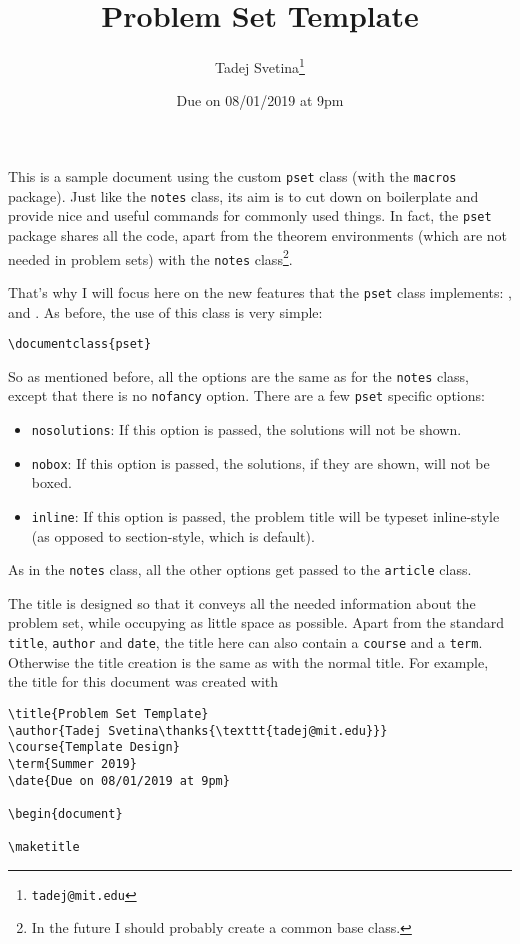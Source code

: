 \documentclass[letterpaper,11pt]{pset}
\title{Problem Set Template}
\author{Tadej Svetina\thanks{\texttt{tadej@mit.edu}}}
\date{Due on 08/01/2019 at 9pm}
\theoremstyle{remark}
\begin{document}
\maketitle

This is a sample document using the custom \texttt{pset} class (with the \texttt{macros} package). Just like the \texttt{notes} class, its aim is to cut down on boilerplate and provide nice and useful commands for commonly used things. In fact, the \texttt{pset} package shares all the code, apart from the theorem environments (which are not needed in problem sets) with the \texttt{notes} class\footnote{In the future I should probably create a common base class.}. 

That's why I will focus here on the new features that the \texttt{pset} class implements: ,  and . As before, the use of this class is very simple:
\begin{verbatim}
\documentclass{pset}
\end{verbatim}

So as mentioned before, all the options are the same as for the \texttt{notes} class, except that there is no \texttt{nofancy} option. There are a few \texttt{pset} specific options:
\begin{itemize}
    \item \texttt{nosolutions}: If this option is passed, the solutions will not be shown.
    \item \texttt{nobox}: If this option is passed, the solutions, if they are shown, will not be boxed.
    \item \texttt{inline}: If this option is passed, the problem title will be typeset inline-style (as opposed to section-style, which is default).
\end{itemize}
As in the \texttt{notes} class, all the other options get passed to the \texttt{article} class.

The title is designed so that it conveys all the needed information about the problem set, while occupying as little space as possible. Apart from the standard \texttt{title}, \texttt{author} and \texttt{date}, the title here can also contain a \texttt{course} and a \texttt{term}. Otherwise the title creation is the same as with the normal title. For example, the title for this document was created with

\begin{verbatim}
\title{Problem Set Template}
\author{Tadej Svetina\thanks{\texttt{tadej@mit.edu}}}
\course{Template Design}
\term{Summer 2019}
\date{Due on 08/01/2019 at 9pm}

\begin{document}

\maketitle
\end{verbatim}
\end{document}
